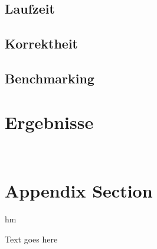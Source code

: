 \documentclass[12pt]{article}
\begin{document}
\subsection{Laufzeit}
\subsection{Korrektheit}
\subsection{Benchmarking}
\section{Ergebnisse}






\newpage~\appendix

\section{Appendix Section}

hm 

Text goes here
\end{document}
